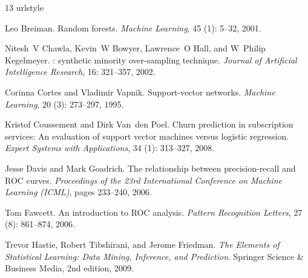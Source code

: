 \documentclass[12pt,a4paper]{report}
\begin{document}
\newpage
{}
\begin{thebibliography}{13}
\providecommand{\natexlab}[1]{#1}
\providecommand{\url}[1]{\texttt{#1}}
\expandafter\ifx\csname urlstyle\endcsname\relax
  \providecommand{\doi}[1]{doi: #1}\else
  \providecommand{\doi}{doi: \begingroup \urlstyle{rm}\Url}\fi

Leo Breiman.
\newblock Random forests.
\newblock \emph{Machine Learning}, 45 (1): 5--32, 2001.

Nitesh~V Chawla, Kevin~W Bowyer, Lawrence~O Hall, and W~Philip Kegelmeyer.
: synthetic minority over-sampling technique.
\newblock \emph{Journal of Artificial Intelligence Research}, 16:
  321--357, 2002.

Corinna Cortes and Vladimir Vapnik.
\newblock Support-vector networks.
\newblock \emph{Machine Learning}, 20 (3): 273--297, 1995.

Kristof Coussement and Dirk Van~den Poel.
\newblock Churn prediction in subscription services: An evaluation of support
  vector machines versus logistic regression.
\newblock \emph{Expert Systems with Applications}, 34 (1):
  313--327, 2008.

Jesse Davis and Mark Goadrich.
\newblock The relationship between precision-recall and {ROC} curves.
\newblock \emph{Proceedings of the 23rd International Conference on Machine
  Learning (ICML)}, pages 233--240, 2006.

Tom Fawcett.
\newblock An introduction to {ROC} analysis.
\newblock \emph{Pattern Recognition Letters}, 27 (8):
  861--874, 2006.

Trevor Hastie, Robert Tibshirani, and Jerome Friedman.
\newblock \emph{The Elements of Statistical Learning: Data Mining, Inference,
  and Prediction}.
\newblock Springer Science \& Business Media, 2nd edition, 2009.


\end{thebibliography}
\end{document}
